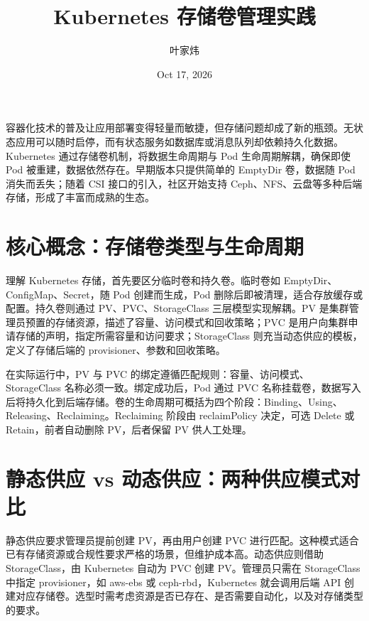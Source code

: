 \title{Kubernetes 存储卷管理实践}
\author{叶家炜}
\date{Oct 17, 2026}
\maketitle
容器化技术的普及让应用部署变得轻量而敏捷，但存储问题却成了新的瓶颈。无状态应用可以随时启停，而有状态服务如数据库或消息队列却依赖持久化数据。Kubernetes 通过存储卷机制，将数据生命周期与 Pod 生命周期解耦，确保即使 Pod 被重建，数据依然存在。早期版本只提供简单的 EmptyDir 卷，数据随 Pod 消失而丢失；随着 CSI 接口的引入，社区开始支持 Ceph、NFS、云盘等多种后端存储，形成了丰富而成熟的生态。\par
\chapter{核心概念：存储卷类型与生命周期}
理解 Kubernetes 存储，首先要区分临时卷和持久卷。临时卷如 EmptyDir、ConfigMap、Secret，随 Pod 创建而生成，Pod 删除后即被清理，适合存放缓存或配置。持久卷则通过 PV、PVC、StorageClass 三层模型实现解耦。PV 是集群管理员预置的存储资源，描述了容量、访问模式和回收策略；PVC 是用户向集群申请存储的声明，指定所需容量和访问要求；StorageClass 则充当动态供应的模板，定义了存储后端的 provisioner、参数和回收策略。\par
在实际运行中，PV 与 PVC 的绑定遵循匹配规则：容量、访问模式、StorageClass 名称必须一致。绑定成功后，Pod 通过 PVC 名称挂载卷，数据写入后将持久化到后端存储。卷的生命周期可概括为四个阶段：Binding、Using、Releasing、Reclaiming。Reclaiming 阶段由 reclaimPolicy 决定，可选 Delete 或 Retain，前者自动删除 PV，后者保留 PV 供人工处理。\par
\chapter{静态供应 vs 动态供应：两种供应模式对比}
静态供应要求管理员提前创建 PV，再由用户创建 PVC 进行匹配。这种模式适合已有存储资源或合规性要求严格的场景，但维护成本高。动态供应则借助 StorageClass，由 Kubernetes 自动为 PVC 创建 PV。管理员只需在 StorageClass 中指定 provisioner，如 aws-ebs 或 ceph-rbd，Kubernetes 就会调用后端 API 创建对应存储卷。选型时需考虑资源是否已存在、是否需要自动化，以及对存储类型的要求。\par
